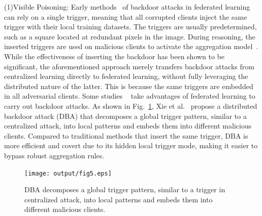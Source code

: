 (1)Visible Poisoning: Early methods~\cite{bagdasaryan2020backdoor,gong2022backdoor} of backdoor
attacks in federated learning can rely on a single trigger,
meaning that all corrupted clients inject the same trigger
with their local training datasets. The triggers are usually predetermined, such as a
square located at redundant pixels in the image. During
reasoning, the inserted triggers are used on malicious
clients to activate the aggregation model~\cite{bagdasaryan2020backdoor,gong2022backdoor}. While
the effectiveness of inserting the backdoor has been shown
to be significant, the aforementioned approach merely
transfers backdoor attacks from centralized learning
directly to federated learning, without fully leveraging the
distributed nature of the latter. This is because the same
triggers are embedded in all adversarial clients. Some
studies ~\cite{xie2019dba} take advantages of federated learning to carry out
backdoor attacks. As shown in Fig.~\ref{fig5}, Xie et al.~\cite{xie2019dba} propose
a distributed backdoor attack (DBA) that decomposes a
global trigger pattern, similar to a centralized attack, into
local patterns and embeds them into different malicious
clients. Compared to traditional methods that insert the
same trigger, DBA is more eﬀicient and covert due to
its hidden local trigger mode, making it easier to bypass
robust aggregation rules. 

\begin{figure}[h]
    \centering
    \texttt{[image: output/fig5.eps]}
     \caption{DBA decomposes a global trigger pattern, similar to a
     trigger in centralized attack, into local patterns and embeds them
     into different malicious clients.}
     \label{fig5}
\end{figure}

